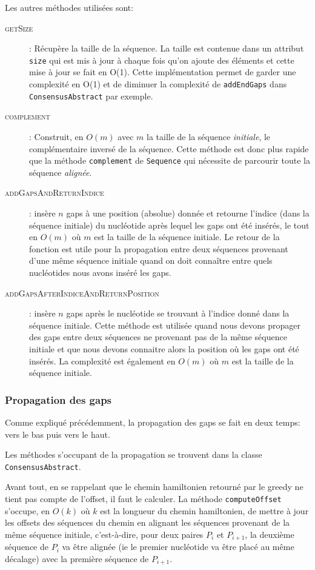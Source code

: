 Les autres méthodes utilisées sont:
\begin{description}
	\item[\textsc{getSize}]: Récupère la taille de la séquence. La taille est
		contenue dans un attribut \verb|size| qui est mis à jour à chaque fois
		qu'on ajoute des éléments et cette mise à jour se fait en O(1). Cette
		implémentation permet de garder une complexité en O(1) et de diminuer la
		complexité de \verb|addEndGaps| dans \verb|ConsensusAbstract| par
		exemple.
	\item[\textsc{complement}]: Construit, en $O(m)$ avec $m$ la taille de la
		séquence \textit{initiale}, le complémentaire inversé de la séquence.
		Cette méthode est donc plus rapide que la méthode \verb|complement| de
		\verb|Sequence| qui nécessite de parcourir toute la séquence
		\textit{alignée}.
	\item[\textsc{addGapsAndReturnIndice}]: insère $n$ gaps à
			une position (absolue) donnée et retourne l'indice (dans la séquence
			initiale) du nucléotide après lequel les gaps ont été insérés, le
			tout en $O(m)$ où $m$ est la taille de la séquence initiale. Le
			retour de la fonction est utile pour la propagation entre deux
			séquences provenant d'une même séquence initiale quand on doit
			connaître entre quels nucléotides nous avons inséré les gaps.
	\item[\textsc{addGapsAfterIndiceAndReturnPosition}]: insère $n$ gaps après
		le nucléotide se trouvant à l'indice donné dans la séquence initiale.
		Cette méthode est utilisée quand nous devons propager des gaps entre
		deux séquences ne provenant pas de la même séquence initiale et que nous
		devons connaitre alors la position où les gaps ont été insérés. La
		complexité est également en $O(m)$ où $m$ est la taille de la séquence
		initiale.
\end{description}

\subsubsection{Propagation des gaps}

Comme expliqué précédemment, la propagation des gaps se fait en deux temps: vers
le bas puis vers le haut.

Les méthodes s'occupant de la propagation se trouvent dans la classe
\verb|ConsensusAbstract|.

Avant tout, en se rappelant que le chemin hamiltonien retourné par le greedy ne
tient pas compte de l'offset, il faut le calculer. La méthode
\verb|computeOffset| s'occupe, en $O(k)$ où $k$ est la longueur du chemin
hamiltonien, de mettre à jour les offsets des séquences du chemin en alignant
les séquences provenant de la même séquence initiale, c'est-à-dire, pour deux
paires $P_{i}$ et $P_{i + 1}$, la deuxième séquence de $P_{i}$ va être alignée
(ie le premier nucléotide va être placé au même décalage) avec la première
séquence de $P_{i + 1}$.

